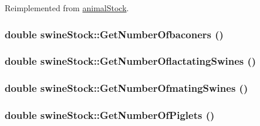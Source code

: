 Reimplemented from \hyperlink{classanimal_stock_af2cf60cd12ce0376947bb5e5adab751d}{animalStock}.\hypertarget{classswine_stock_a36ba5282d1d0d0b36d04958d77c74552}{
\subsubsection[{GetNumberOfbaconers}]{\setlength{\rightskip}{0pt plus 5cm}double swineStock::GetNumberOfbaconers ()}}
\label{classswine_stock_a36ba5282d1d0d0b36d04958d77c74552}
\hypertarget{classswine_stock_ab15ee6eea81d51b18f910e2304d62837}{
\subsubsection[{GetNumberOflactatingSwines}]{\setlength{\rightskip}{0pt plus 5cm}double swineStock::GetNumberOflactatingSwines ()}}
\label{classswine_stock_ab15ee6eea81d51b18f910e2304d62837}
\hypertarget{classswine_stock_a6797f1e6e9c86ac73c08571cf8c6e3f3}{
\subsubsection[{GetNumberOfmatingSwines}]{\setlength{\rightskip}{0pt plus 5cm}double swineStock::GetNumberOfmatingSwines ()}}
\label{classswine_stock_a6797f1e6e9c86ac73c08571cf8c6e3f3}
\hypertarget{classswine_stock_a7f919fd97ef7455eb5d124e82e0667ad}{
\subsubsection[{GetNumberOfPiglets}]{\setlength{\rightskip}{0pt plus 5cm}double swineStock::GetNumberOfPiglets ()}}
